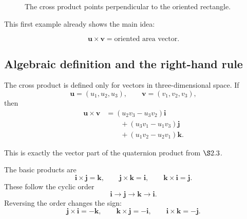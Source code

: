 \begin{figure}[h]
\centering
{}
\caption{The cross product points perpendicular to the oriented rectangle.}
\end{figure}

This first example already shows the main idea:

\[
    \mathbf u\times\mathbf v
    =
    \text{oriented area vector}.
\]

\subsection{Algebraic definition and the right-hand rule}

The cross product is defined only for vectors in three-dimensional space.  If
\[
    \mathbf u=(u_1,u_2,u_3),
    \qquad
    \mathbf v=(v_1,v_2,v_3),
\]
then
\[
\boxed{
\begin{aligned}
\mathbf u\times\mathbf v
&=
(u_2v_3-u_3v_2)\mathbf i\\
&\qquad
+(u_3v_1-u_1v_3)\mathbf j\\
&\qquad
+(u_1v_2-u_2v_1)\mathbf k.
\end{aligned}
}
\]

This is exactly the vector part of the quaternion product from \(\S 2.3\).

The basic products are
\[
    \mathbf i\times\mathbf j=\mathbf k,
    \qquad
    \mathbf j\times\mathbf k=\mathbf i,
    \qquad
    \mathbf k\times\mathbf i=\mathbf j.
\]
These follow the cyclic order
\[
    \mathbf i\to \mathbf j\to \mathbf k\to \mathbf i.
\]
Reversing the order changes the sign:
\[
    \mathbf j\times\mathbf i=-\mathbf k,
    \qquad
    \mathbf k\times\mathbf j=-\mathbf i,
    \qquad
    \mathbf i\times\mathbf k=-\mathbf j.
\]

